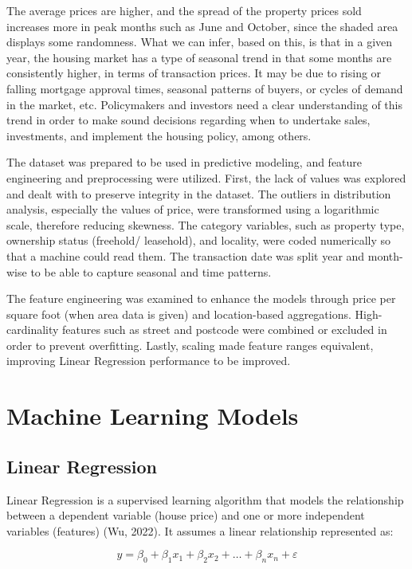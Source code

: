 \documentclass[12pt, a4paper, oneside]{book}
\begin{document}
The average prices are higher, and the spread of the property prices sold increases more in peak months such as June and October, since the shaded area displays some randomness. What we can infer, based on this, is that in a given year, the housing market has a type of seasonal trend in that some months are consistently higher, in terms of transaction prices. It may be due to rising or falling mortgage approval times, seasonal patterns of buyers, or cycles of demand in the market, etc. Policymakers and investors need a clear understanding of this trend in order to make sound decisions regarding when to undertake sales, investments, and implement the housing policy, among others.


The dataset was prepared to be used in predictive modeling, and feature engineering and preprocessing were utilized. First, the lack of values was explored and dealt with to preserve integrity in the dataset. The outliers in distribution analysis, especially the values of price, were transformed using a logarithmic scale, therefore reducing skewness. The category variables, such as property type, ownership status (freehold/ leasehold), and locality, were coded numerically so that a machine could read them. The transaction date was split year and month-wise to be able to capture seasonal and time patterns.

The feature engineering was examined to enhance the models through price per square foot (when area data is given) and location-based aggregations. High-cardinality features such as street and postcode were combined or excluded in order to prevent overfitting. Lastly, scaling made feature ranges equivalent, improving Linear Regression performance to be improved.


\section{Machine Learning Models}

\subsection{Linear Regression}

Linear Regression is a supervised learning algorithm that models the relationship between a dependent variable (house price) and one or more independent variables (features) (Wu, 2022). It assumes a linear relationship represented as:

\[
y = \beta_0 + \beta_1x_1 + \beta_2x_2 + \ldots + \beta_nx_n + \varepsilon
\]
\end{document}
